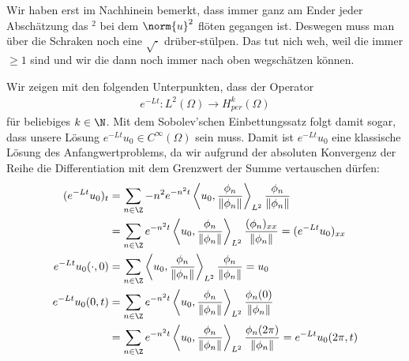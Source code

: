 \begin{solution}

\phantom{}

\begin{tcolorbox}
  Wir haben erst im Nachhinein bemerkt, dass immer ganz am Ender jeder Abschätzung das $^2$ bei dem $\norm{u}^2$ flöten gegangen ist.
  Deswegen muss man über die Schraken noch eine $\sqrt{\cdot}$ drüber-stülpen.
  Das tut nich weh, weil die immer $\geq 1$ sind und wir die dann noch immer nach oben wegschätzen können.
\end{tcolorbox}

Wir zeigen mit den folgenden Unterpunkten, dass der Operator
\begin{align*}
  e^{-Lt}: L^2(\Omega) \to H_{per}^k(\Omega)
\end{align*}
für beliebiges $k \in \N$. Mit dem Sobolev'schen Einbettungssatz folgt damit
sogar, dass unsere Lösung $e^{-Lt}u_0 \in C^{\infty}(\Omega)$ sein muss.
Damit ist $e^{-Lt}u_0$ eine klassische Lösung des Anfangwertproblems, da
wir aufgrund der absoluten Konvergenz der Reihe die Differentiation mit dem
Grenzwert der Summe vertauschen dürfen:
\begin{align*}
  (e^{-Lt}u_0)_t &= \sum_{n\in\Z}-n^2e^{-n^2t}\left\langle u_0,
  \frac{\phi_{n}}{\left\|\phi_{n}\right\|}\right\rangle_{L^{2}}
  \frac{\phi_{n}}{\left\|\phi_{n}\right\|} \\
  &= \sum_{n\in\Z}e^{-n^2t}\left\langle u_0,
  \frac{\phi_{n}}{\left\|\phi_{n}\right\|}\right\rangle_{L^{2}}
  \frac{(\phi_{n})_{xx}}{\left\|\phi_{n}\right\|}
  = (e^{-Lt}u_0)_{xx} \\
  e^{-Lt}u_0(\cdot,0) &= \sum_{n\in\Z}\left\langle u_0,
  \frac{\phi_{n}}{\left\|\phi_{n}\right\|}\right\rangle_{L^{2}}
  \frac{\phi_{n}}{\left\|\phi_{n}\right\|} = u_0 \\
  e^{-Lt}u_0(0,t) &= \sum_{n\in\Z}e^{-n^2t}\left\langle u_0,
  \frac{\phi_{n}}{\left\|\phi_{n}\right\|}\right\rangle_{L^{2}}
  \frac{\phi_{n}(0)}{\left\|\phi_{n}\right\|} \\
  &= \sum_{n\in\Z}e^{-n^2t}\left\langle u_0,
  \frac{\phi_{n}}{\left\|\phi_{n}\right\|}\right\rangle_{L^{2}}
  \frac{\phi_{n}(2\pi)}{\left\|\phi_{n}\right\|} = e^{-Lt}u_0(2\pi,t)
\end{align*}


\end{solution}
